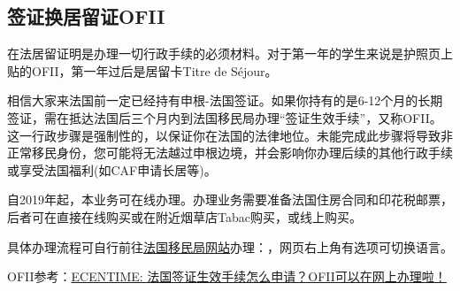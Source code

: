 \subsection{签证换居留证OFII}
在法居留证明是办理一切行政手续的必须材料。对于第一年的学生来说是护照页上贴的OFII，第一年过后是居留卡Titre de Séjour。

相信大家来法国前一定已经持有申根-法国签证。如果你持有的是6-12个月的长期签证，需在抵达法国后三个月内到法国移民局办理“签证生效手续”，又称OFII。 这一行政步骤是强制性的，以保证你在法国的法律地位。未能完成此步骤将导致非正常移民身份，您可能将无法越过申根边境，并会影响你办理后续的其他行政手续或享受法国福利(如CAF申请长居等)。

自2019年起，本业务可在线办理。办理业务需要准备法国住房合同和印花税邮票，后者可在直接在线购买或在附近烟草店Tabac购买，或线上购买。

具体办理流程可自行前往\href{https://administration-etrangers-en-france.interieur.gouv.fr}{法国移民局网站}办理：，网页右上角有选项可切换语言。

OFII参考：\href{https://www.ecentime.com/article/tuto-ofii}{ECENTIME: 法国签证生效手续怎么申请？OFII可以在网上办理啦！}
